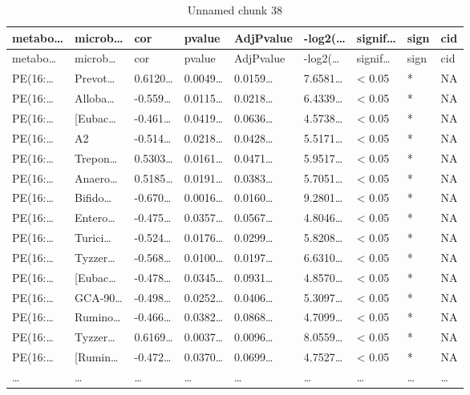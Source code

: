 \documentclass[
]{article}
\begin{document}
\begin{longtable}[]{@{}lllllllll@{}}
\caption{\label{tab:unnamed-chunk-38}Unnamed chunk 38}\tabularnewline
\toprule
metabo\ldots{} & microb\ldots{} & cor & pvalue & AdjPvalue & -log2(\ldots{} & signif\ldots{} & sign & cid\tabularnewline
\midrule
\endfirsthead
\toprule
metabo\ldots{} & microb\ldots{} & cor & pvalue & AdjPvalue & -log2(\ldots{} & signif\ldots{} & sign & cid\tabularnewline
\midrule
\endhead
PE(16:\ldots{} & Prevot\ldots{} & 0.6120\ldots{} & 0.0049\ldots{} & 0.0159\ldots{} & 7.6581\ldots{} & \textless{} 0.05 & * & NA\tabularnewline
PE(16:\ldots{} & Alloba\ldots{} & -0.559\ldots{} & 0.0115\ldots{} & 0.0218\ldots{} & 6.4339\ldots{} & \textless{} 0.05 & * & NA\tabularnewline
PE(16:\ldots{} & {[}Eubac\ldots{} & -0.461\ldots{} & 0.0419\ldots{} & 0.0636\ldots{} & 4.5738\ldots{} & \textless{} 0.05 & * & NA\tabularnewline
PE(16:\ldots{} & A2 & -0.514\ldots{} & 0.0218\ldots{} & 0.0428\ldots{} & 5.5171\ldots{} & \textless{} 0.05 & * & NA\tabularnewline
PE(16:\ldots{} & Trepon\ldots{} & 0.5303\ldots{} & 0.0161\ldots{} & 0.0471\ldots{} & 5.9517\ldots{} & \textless{} 0.05 & * & NA\tabularnewline
PE(16:\ldots{} & Anaero\ldots{} & 0.5185\ldots{} & 0.0191\ldots{} & 0.0383\ldots{} & 5.7051\ldots{} & \textless{} 0.05 & * & NA\tabularnewline
PE(16:\ldots{} & Bifido\ldots{} & -0.670\ldots{} & 0.0016\ldots{} & 0.0160\ldots{} & 9.2801\ldots{} & \textless{} 0.05 & * & NA\tabularnewline
PE(16:\ldots{} & Entero\ldots{} & -0.475\ldots{} & 0.0357\ldots{} & 0.0567\ldots{} & 4.8046\ldots{} & \textless{} 0.05 & * & NA\tabularnewline
PE(16:\ldots{} & Turici\ldots{} & -0.524\ldots{} & 0.0176\ldots{} & 0.0299\ldots{} & 5.8208\ldots{} & \textless{} 0.05 & * & NA\tabularnewline
PE(16:\ldots{} & Tyzzer\ldots{} & -0.568\ldots{} & 0.0100\ldots{} & 0.0197\ldots{} & 6.6310\ldots{} & \textless{} 0.05 & * & NA\tabularnewline
PE(16:\ldots{} & {[}Eubac\ldots{} & -0.478\ldots{} & 0.0345\ldots{} & 0.0931\ldots{} & 4.8570\ldots{} & \textless{} 0.05 & * & NA\tabularnewline
PE(16:\ldots{} & GCA-90\ldots{} & -0.498\ldots{} & 0.0252\ldots{} & 0.0406\ldots{} & 5.3097\ldots{} & \textless{} 0.05 & * & NA\tabularnewline
PE(16:\ldots{} & Rumino\ldots{} & -0.466\ldots{} & 0.0382\ldots{} & 0.0868\ldots{} & 4.7099\ldots{} & \textless{} 0.05 & * & NA\tabularnewline
PE(16:\ldots{} & Tyzzer\ldots{} & 0.6169\ldots{} & 0.0037\ldots{} & 0.0096\ldots{} & 8.0559\ldots{} & \textless{} 0.05 & * & NA\tabularnewline
PE(16:\ldots{} & {[}Rumin\ldots{} & -0.472\ldots{} & 0.0370\ldots{} & 0.0699\ldots{} & 4.7527\ldots{} & \textless{} 0.05 & * & NA\tabularnewline
\ldots{} & \ldots{} & \ldots{} & \ldots{} & \ldots{} & \ldots{} & \ldots{} & \ldots{} & \ldots{}\tabularnewline
\bottomrule
\end{longtable}
\end{document}
